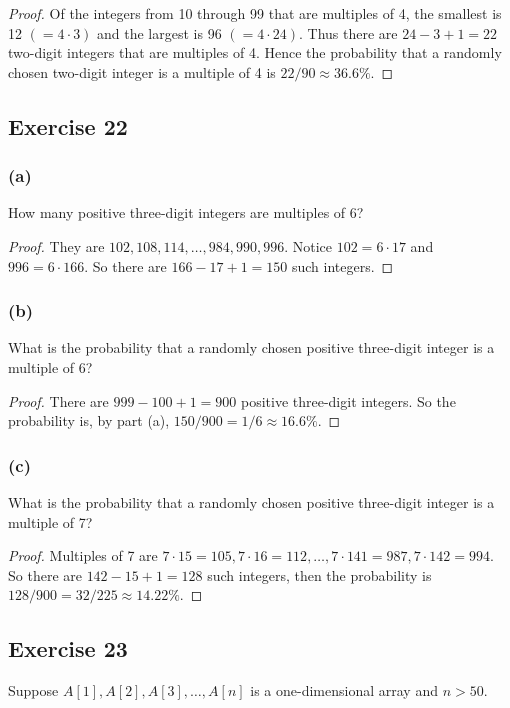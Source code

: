 \documentclass[14pt]{extarticle}
\begin{document}
\begin{proof}
     Of the integers from 10 through 99 that are multiples of 4, the smallest is 12 \((= 4 \cdot 3)\) and the largest is 96
     \((= 4 \cdot 24)\). Thus there are \(24 - 3 + 1 = 22\) two-digit integers that are multiples of 4. Hence the
     probability that a randomly chosen two-digit integer is a multiple of 4 is \(22/90 \approx 36.6\%\).
\end{proof}

\subsection{Exercise 22}
\subsubsection{(a)}
How many positive three-digit integers are multiples of 6?

\begin{proof}
     They are \(102, 108, 114, \ldots, 984, 990, 996\). Notice \(102 = 6 \cdot 17\) and \(996 = 6 \cdot 166\). So there
     are \(166 - 17 + 1 = 150\) such integers.
\end{proof}

\subsubsection{(b)}
What is the probability that a randomly chosen positive three-digit integer is a multiple of 6?

\begin{proof}
     There are \(999 - 100 + 1 = 900\) positive three-digit integers. So the probability is, by part (a),
     \(150/900 = 1/6 \approx 16.6\%\).
\end{proof}

\subsubsection{(c)}
What is the probability that a randomly chosen positive three-digit integer is a multiple of 7?

\begin{proof}
     Multiples of 7 are \(7 \cdot 15 = 105, 7 \cdot 16 = 112, \ldots, 7 \cdot 141 = 987, 7 \cdot 142 = 994\). So there
     are \(142 - 15 + 1 = 128\) such integers, then the probability is \(128/900 = 32/225 \approx 14.22\%\).
\end{proof}

\subsection{Exercise 23}
Suppose \(A[1], A[2], A[3], \ldots, A[n]\) is a one-dimensional array and \(n > 50\).
\end{document}

